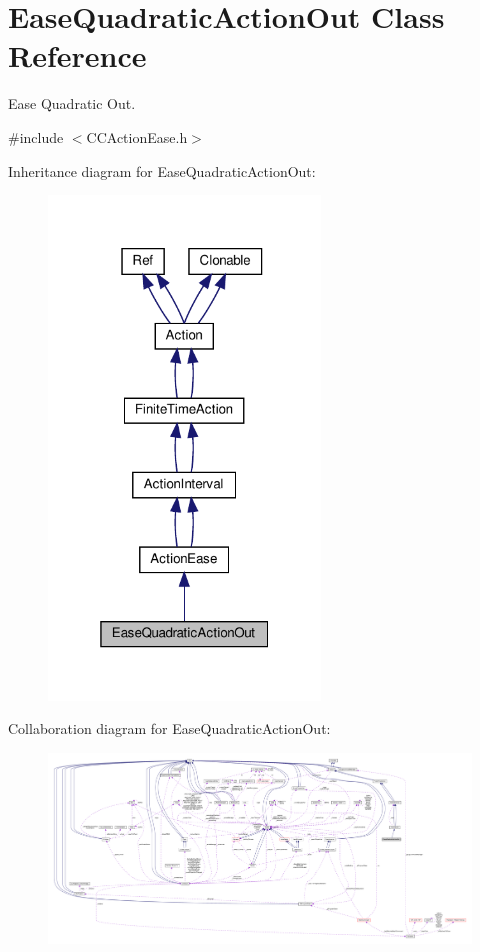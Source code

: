 \hypertarget{classEaseQuadraticActionOut}{}\section{Ease\+Quadratic\+Action\+Out Class Reference}
\label{classEaseQuadraticActionOut}


Ease Quadratic Out.  




{\ttfamily \#include $<$C\+C\+Action\+Ease.\+h$>$}



Inheritance diagram for Ease\+Quadratic\+Action\+Out\+:
\nopagebreak
\begin{figure}[H]
\begin{center}
\leavevmode
\includegraphics[width=205pt]{classEaseQuadraticActionOut__inherit__graph}
\end{center}
\end{figure}


Collaboration diagram for Ease\+Quadratic\+Action\+Out\+:
\nopagebreak
\begin{figure}[H]
\begin{center}
\leavevmode
\includegraphics[width=350pt]{classEaseQuadraticActionOut__coll__graph}
\end{center}
\end{figure}
